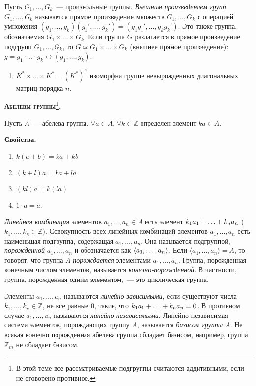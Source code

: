 \documentclass[a4paper]{article}
\newcommand*{\tema}[1]{\vspace{20pt}
\begin{center}{\textbf{\textsc{#1.}}}\vspace{5pt}
\end{center}}
\newcommand{\svoy}{\vspace{5pt}\noindent\textbf{Свойства.}\vspace{-6pt}}
\newcommand*{\p}[1]{#1\nobreak\discretionary{}{\hbox{$\mathsurround=0pt #1$}}{}}
\begin{document}
Пусть $G_1,\ldots,G_k$~--- произвольные группы. \emph{Внешним
произведением групп $G_1,\ldots,G_k$} называется прямое произведение
множеств $G_1,\ldots,G_k$ с операцией умножения
$(g_1,\ldots,g_k)(g_1',\ldots,g_k')=(g_1g_1',\ldots,g_kg_k')$. Это
также группа, обозначаемая $G_1\times \ldots\times G_k$. Если группа
$G$ разлагается в прямое произведение подгрупп $G_1,\ldots,G_k$, то
$G\simeq G_1\times\ldots \times G_k$ (внешнее прямое произведение):
$g=g_1\cdot\ldots\cdot g_k\leftrightarrow (g_1,\ldots,g_k)$.

\begin{ex}
\begin{enumerate}
  \item $K^*\times\ldots\times K^*=(K^*)^n$ изоморфна группе невырожденных
диагональных матриц порядка $n$.
\end{enumerate}
\end{ex}

\tema{Абелевы группы\footnote{В этой теме все рассматриваемые
подгруппы считаются аддитивными, если не оговорено противное.}}

Пусть $A$~--- абелева группа. $\forall a\in A$, $\forall k\in
\mathbb{Z}$ определен элемент $ka\in A$.

\svoy
\begin{enumerate}
  \item $k(a+b)=ka+kb$
  \item $(k+l)a=ka+la$
  \item $(kl)a=k(la)$
  \item $1\cdot a=a$.
\end{enumerate}

\emph{Линейная комбинация} элементов $a_1,\ldots,a_n\in A$ есть
элемент $k_1a_1\p+\p\ldots+k_na_n$ ($k_1,\ldots,k_n\in \mathbb{Z}$).
Совокупность всех линейных комбинаций элементов $a_1,\ldots,a_n$
есть наименьшая подгруппа, содержащая $a_1,\ldots,a_n$. Она
называется подгруппой, \emph{порожденной} $a_1,\ldots,a_n$ и
обозначается как $\langle a_1,\p\ldots,a_n\rangle$. Если $\langle
a_1,\ldots,a_n\rangle=A$, то говорят, что группа $A$
\emph{порождается} элементами $a_1,\ldots,a_n$. Группа, порожденная
конечным числом элементов, называется \emph{конечно-порожденной}. В
частности, группа, порожденная одним элементом,~--- это циклическая
группа.

Элементы $a_1,\ldots,a_n$ называются \emph{линейно зависимыми}, если
существуют числа $k_1,\ldots,k_n\in \mathbb{Z}$, не все равные 0,
такие, что $k_1a_1+\ldots+k_na_n\p=0$. В противном случае
$a_1,\ldots,a_n$ называются \emph{линейно независимыми}. Линейно
независимая система элементов, порождающих группу $A$, называется
\emph{базисом группы $A$}. Не всякая конечно порожденная абелева
группа обладает базисом, например, группа $\mathbb{Z}_m$ не обладает
базисом.
\end{document}
